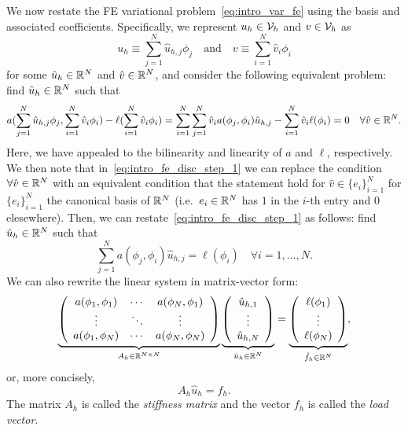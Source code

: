We now restate the FE variational problem~\eqref{eq:intro_var_fe} using the basis and associated coefficients.  Specifically, we represent $u_h \in \calV_h$ and $v \in \calV_h$ as 
\begin{equation*}
  u_h \equiv \sum_{j=1}^N \hat u_{h,j} \phi_j \quad \text{and} \quad v \equiv \sum_{i=1}^N \hat v_i \phi_i
\end{equation*}
for some $\hat u_h \in \RR^N$ and $\hat v \in \RR^N$, and consider the following equivalent problem: find $\hat u_h \in \RR^N$ such that
\begin{equation}
  a(\sum_{j=1}^N \hat u_{h,j} \phi_j, \sum_{i=1}^N \hat v_i \phi_i) - \ell(\sum_{i=1}^N \hat v_i \phi_i)
  =
  \sum_{i=1}^N \sum_{j=1}^N \hat v_i a(\phi_j, \phi_i) \hat u_{h,j} -
  \sum_{i=1}^N \hat v_i \ell(\phi_i) = 0 \quad \forall \hat v \in \RR^N.
  \label{eq:intro_fe_disc_step_1}
\end{equation}
Here, we have appealed to the bilinearity and linearity of $a$ and $\ell$, respectively. We then note that in~\eqref{eq:intro_fe_disc_step_1} we can replace the condition $\forall \hat v \in \RR^N$ with an equivalent condition that the statement hold for $\hat v \in \{e_i \}_{i=1}^N$ for $\{e_i\}_{i=1}^N$ the canonical basis of $\RR^N$ (i.e.~$e_i \in \RR^N$ has $1$ in the $i$-th entry and $0$ elesewhere). Then, we can restate~\eqref{eq:intro_fe_disc_step_1} as follows: find $\hat u_h \in \RR^N$ such that
\begin{equation}
  \sum_{j=1}^N a(\phi_j,\phi_i) \hat u_{h,j} = \ell(\phi_i) \quad  \forall i = 1,\dots,N.
  \label{eq:intro_sys}
\end{equation}
We can also rewrite the linear system in matrix-vector form:
\begin{equation*}
  \underbrace{ \bmat{ccc}
  a(\phi_1,\phi_1) & \cdots & a(\phi_N,\phi_1) \\
  \vdots & \ddots & \vdots \\
  a(\phi_1,\phi_N) & \cdots & a(\phi_N,\phi_N) \\
  \emat
  }_{A_h \in \RR^{N \times N}}
  \underbrace{ \bmat{c} \hat u_{h,1}  \\ \vdots \\ \hat u_{h,N} \emat }_{\hat u_h \in \RR^N}
  =
  \underbrace{ \bmat{c} \ell(\phi_1) \\ \vdots \\ \ell(\phi_N) \emat }_{\hat f_h \in \RR^N},
\end{equation*}
or, more concisely,
\begin{equation*}
  A_h \hat u_h = f_h.
\end{equation*}
The matrix $A_h$ is called the \emph{stiffness matrix} and the vector $f_h$ is called the \emph{load vector}.

